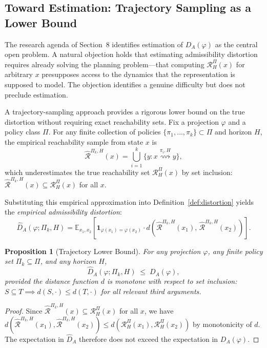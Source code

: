\documentclass[11pt, a4paper]{article}
\theoremstyle{plain}
\newtheorem{proposition}{Proposition}
\theoremstyle{definition}
\theoremstyle{remark}
\newcommand{\RHP}{\mathcal{R}_H^\Pi}
\newcommand{\DA}{D_A(\varphi)}
\begin{document}
\subsection{Toward Estimation: Trajectory Sampling as a Lower Bound}

The research agenda of Section~8 identifies estimation of $\DA$ as the central open problem. A natural objection holds that estimating admissibility distortion requires already solving the planning problem---that computing $\RHP(x)$ for arbitrary $x$ presupposes access to the dynamics that the representation is supposed to model. The objection identifies a genuine difficulty but does not preclude estimation.

A trajectory-sampling approach provides a rigorous lower bound on the true distortion without requiring exact reachability sets. Fix a projection $\varphi$ and a policy class $\Pi$. For any finite collection of policies $\{\pi_1, \ldots, \pi_k\} \subset \Pi$ and horizon $H$, the empirical reachability sample from state $x$ is
\begin{equation}
  \hat{\mathcal{R}}^{\Pi_k, H}(x) = \bigcup_{i=1}^{k} \{y : x \overset{\pi_i, H}{\rightsquigarrow} y\},
\end{equation}
which underestimates the true reachability set $\RHP(x)$ by set inclusion:
$\hat{\mathcal{R}}^{\Pi_k, H}(x) \subseteq \RHP(x)$ for all $x$.

Substituting this empirical approximation into Definition~\ref{def:distortion} yields the \emph{empirical admissibility distortion}:
\begin{equation}
  \hat{D}_A(\varphi; \Pi_k, H)
  = \mathbb{E}_{x_1, x_2}\!\left[
      \mathbf{1}_{\varphi(x_1) = \varphi(x_2)}
      \cdot d\!\left(\hat{\mathcal{R}}^{\Pi_k, H}(x_1),\, \hat{\mathcal{R}}^{\Pi_k, H}(x_2)\right)
    \right].
\end{equation}

\begin{proposition}[Trajectory Lower Bound]
\label{prop:lower_bound}
For any projection $\varphi$, any finite policy set $\Pi_k \subseteq \Pi$, and any horizon $H$,
\begin{equation}
  \hat{D}_A(\varphi; \Pi_k, H) \;\leq\; \DA,
\end{equation}
provided the distance function $d$ is monotone with respect to set inclusion: $S \subseteq T \implies d(S, \cdot) \leq d(T, \cdot)$ for all relevant third arguments.
\end{proposition}

\begin{proof}
Since $\hat{\mathcal{R}}^{\Pi_k, H}(x) \subseteq \RHP(x)$ for all $x$, we have
$d(\hat{\mathcal{R}}^{\Pi_k, H}(x_1), \hat{\mathcal{R}}^{\Pi_k, H}(x_2))
\leq d(\RHP(x_1), \RHP(x_2))$ by monotonicity of $d$. The expectation in
$\hat{D}_A$ therefore does not exceed the expectation in $\DA$.
\end{proof}
\end{document}

